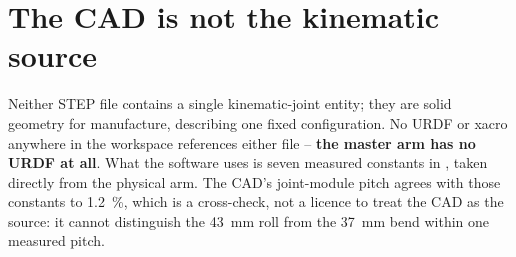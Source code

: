 \section{The CAD is not the kinematic source}
\label{sec:cad-not-source}

Neither STEP file contains a single kinematic-joint entity; they are solid
geometry for manufacture, describing one fixed configuration. No URDF or
xacro anywhere in the workspace references either file -- \textbf{the master
arm has no URDF at all}. What the software uses is seven measured constants
in , taken directly from the
physical arm. The CAD's joint-module pitch agrees with those constants to
\SI{1.2}{\percent}, which is a cross-check, not a licence to treat the CAD
as the source: it cannot distinguish the \SI{43}{\milli\metre} roll from the
\SI{37}{\milli\metre} bend within one measured pitch.
